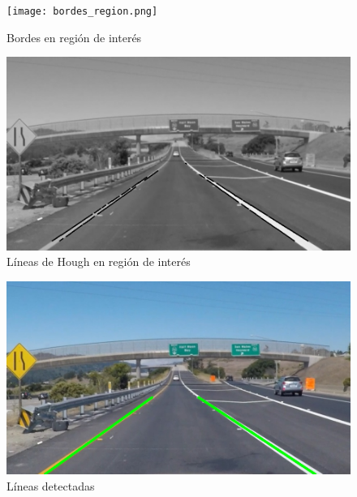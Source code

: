 \documentclass[10pt]{IEEEtran}
\begin{document}
\begin{figure}
\texttt{[image: bordes\_region.png]}
\caption{Bordes en región de interés}
\label{fig:bordes_region}
\end{figure}

\begin{figure}
\includegraphics[scale = 0.25]{hough_region.png}
\caption{Líneas de Hough en región de interés}
\label{fig:hough_region}
\end{figure}

\begin{figure}
\includegraphics[scale = 0.25]{final.png}
\caption{Líneas detectadas}
\label{fig:final}
\end{figure}



\end{document}
